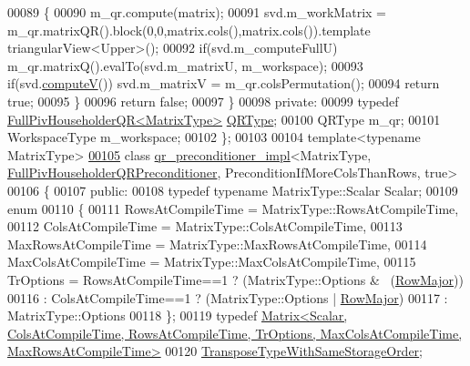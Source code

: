 \begin{DoxyCode}
00089     \{
00090       m\_qr.compute(matrix);
00091       svd.m\_workMatrix = m\_qr.matrixQR().block(0,0,matrix.cols(),matrix.cols()).\textcolor{keyword}{template} 
      triangularView<Upper>();
00092       \textcolor{keywordflow}{if}(svd.m\_computeFullU) m\_qr.matrixQ().evalTo(svd.m\_matrixU, m\_workspace);
00093       \textcolor{keywordflow}{if}(svd.\hyperlink{group___s_v_d___module_a5f12efcb791eb007d4a4890ac5255ac4}{computeV}()) svd.m\_matrixV = m\_qr.colsPermutation();
00094       \textcolor{keywordflow}{return} \textcolor{keyword}{true};
00095     \}
00096     \textcolor{keywordflow}{return} \textcolor{keyword}{false};
00097   \}
00098 \textcolor{keyword}{private}:
00099   \textcolor{keyword}{typedef} \hyperlink{group___q_r___module}{FullPivHouseholderQR<MatrixType>} 
      \hyperlink{group___q_r___module}{QRType};
00100   QRType m\_qr;
00101   WorkspaceType m\_workspace;
00102 \};
00103 
00104 \textcolor{keyword}{template}<\textcolor{keyword}{typename} MatrixType>
\hyperlink{class_eigen_1_1internal_1_1qr__preconditioner__impl_3_01_matrix_type_00_01_full_piv_householder_0bfd000ff4c8127883e77da4144b4435}{00105} \textcolor{keyword}{class }\hyperlink{struct_eigen_1_1internal_1_1qr__preconditioner__impl}{qr\_preconditioner\_impl}<MatrixType, 
      \hyperlink{group__enums_gga46eba0d5c621f590b8cf1b53af31d56ea566c44ba828dea7f5d2fb174d799d5d2}{FullPivHouseholderQRPreconditioner}, PreconditionIfMoreColsThanRows, true>
00106 \{
00107 \textcolor{keyword}{public}:
00108   \textcolor{keyword}{typedef} \textcolor{keyword}{typename} MatrixType::Scalar Scalar;
00109   \textcolor{keyword}{enum}
00110   \{
00111     RowsAtCompileTime = MatrixType::RowsAtCompileTime,
00112     ColsAtCompileTime = MatrixType::ColsAtCompileTime,
00113     MaxRowsAtCompileTime = MatrixType::MaxRowsAtCompileTime,
00114     MaxColsAtCompileTime = MatrixType::MaxColsAtCompileTime,
00115     TrOptions = RowsAtCompileTime==1 ? (MatrixType::Options & ~(\hyperlink{group__enums_ggaacded1a18ae58b0f554751f6cdf9eb13acfcde9cd8677c5f7caf6bd603666aae3}{RowMajor}))
00116               : ColsAtCompileTime==1 ? (MatrixType::Options |   \hyperlink{group__enums_ggaacded1a18ae58b0f554751f6cdf9eb13acfcde9cd8677c5f7caf6bd603666aae3}{RowMajor})
00117               : MatrixType::Options
00118   \};
00119   \textcolor{keyword}{typedef} 
      \hyperlink{group___core___module}{Matrix<Scalar, ColsAtCompileTime, RowsAtCompileTime, TrOptions, MaxColsAtCompileTime, MaxRowsAtCompileTime>}
00120           \hyperlink{group___core___module}{TransposeTypeWithSameStorageOrder};

\end{DoxyCode}
